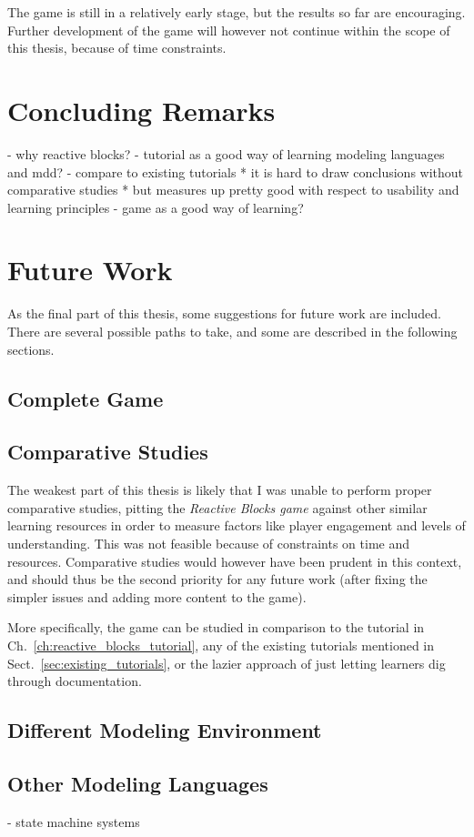 \noindent
The game is still in a relatively early stage, but the results so far are encouraging. Further development of the game will however not continue within the scope of this thesis, because of time constraints.


\section{Concluding Remarks}
\label{sec:concluding_remarks}

- why reactive blocks?
- tutorial as a good way of learning modeling languages and mdd?
- compare to existing tutorials
	* it is hard to draw conclusions without comparative studies
	* but measures up pretty good with respect to usability and learning principles
- game as a good way of learning?





\section{Future Work}
\label{sec:future_work}
As the final part of this thesis, some suggestions for future work are included. There are several possible paths to take, and some are described in the following sections.

\subsection{Complete Game}





\subsection{Comparative Studies}
The weakest part of this thesis is likely that I was unable to perform proper comparative studies, pitting the \emph{Reactive Blocks game} against other similar learning resources in order to measure factors like player engagement and levels of understanding. This was not feasible because of constraints on time and resources. Comparative studies would however have been prudent in this context, and should thus be the second priority for any future work (after fixing the simpler issues and adding more content to the game).

\noindent
More specifically, the game can be studied in comparison to the tutorial in Ch.~\ref{ch:reactive_blocks_tutorial}, any of the existing tutorials mentioned in Sect.~\ref{sec:existing_tutorials}, or the lazier approach of just letting learners dig through documentation.

\subsection{Different Modeling Environment}


\subsection{Other Modeling Languages}
- state machine systems